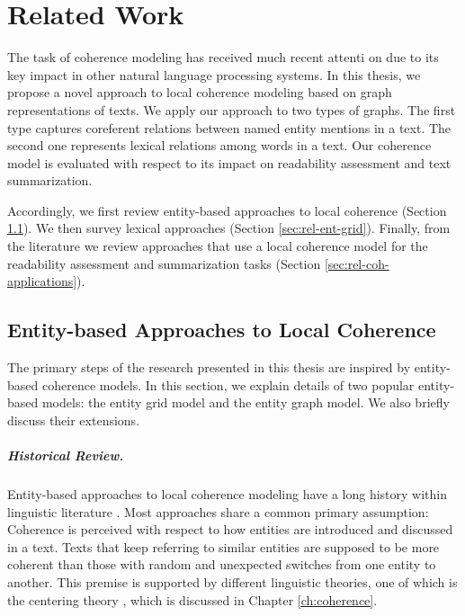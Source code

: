 
\chapter{Related Work}
\label{ch:rel-work}
 
The task of coherence modeling has received much recent attenti	on due to its key impact in other natural language processing systems. 
In this thesis, we propose a novel approach to local coherence modeling based on graph representations of texts. 
We apply our approach to two types of graphs.  
The first type captures coreferent relations between named entity mentions in a text.
The second one represents lexical relations among words in a text.  
Our coherence model is evaluated with respect to its impact on readability assessment and text summarization. 

Accordingly, we first review entity-based approaches to local coherence (Section \ref{sec:rel-entity-models}). 
We then survey lexical approaches (Section \ref{sec:rel-ent-grid}). 
Finally, from the literature we review approaches that use a local coherence model for the readability assessment and summarization tasks (Section \ref{sec:rel-coh-applications}). 

\section{Entity-based Approaches to Local Coherence}
\label{sec:rel-entity-models}

The primary steps of the research presented in this thesis are inspired by entity-based coherence models. 
In this section, we explain details of two popular entity-based models: the entity grid model and the entity graph model. 
We also briefly discuss their extensions.  

\paragraph{Historical Review.} 
Entity-based approaches to local coherence modeling have a long history within linguistic literature \cite{kuno72,halliday76,prince81a,joshi98}.
Most approaches share a common primary assumption: Coherence is perceived with respect to how entities are introduced and discussed in a text. 
Texts that keep referring to similar entities are supposed to be more coherent than those with random and unexpected switches from one entity to another. 
This premise is supported by different linguistic theories, one of which is the centering theory \cite{grosz95,joshi98}, which is discussed in Chapter \ref{ch:coherence}. 


